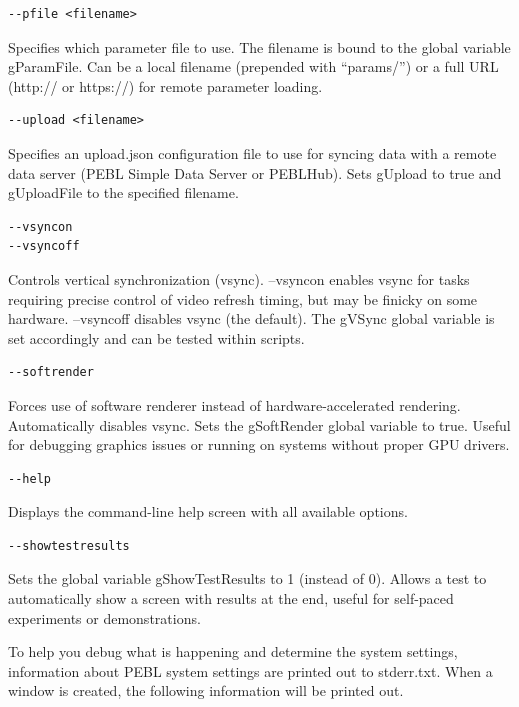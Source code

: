 \begin{description}
\item
\begin{verbatim}
--pfile <filename>
\end{verbatim}
  Specifies which parameter file to use. The filename is bound to the global variable
  gParamFile. Can be a local filename (prepended with ``params/'') or a full URL
  (http:// or https://) for remote parameter loading.

\item
\begin{verbatim}
--upload <filename>
\end{verbatim}
  Specifies an upload.json configuration file to use for syncing data with a
  remote data server (PEBL Simple Data Server or PEBLHub). Sets gUpload to true
  and gUploadFile to the specified filename.

\item
\begin{verbatim}
--vsyncon
--vsyncoff
\end{verbatim}
  Controls vertical synchronization (vsync). --vsyncon enables vsync for tasks
  requiring precise control of video refresh timing, but may be finicky on some
  hardware. --vsyncoff disables vsync (the default). The gVSync global variable
  is set accordingly and can be tested within scripts.

\item
\begin{verbatim}
--softrender
\end{verbatim}
  Forces use of software renderer instead of hardware-accelerated rendering.
  Automatically disables vsync. Sets the gSoftRender global variable to true.
  Useful for debugging graphics issues or running on systems without proper
  GPU drivers.

\item
\begin{verbatim}
--help
\end{verbatim}
  Displays the command-line help screen with all available options.

\item
\begin{verbatim}
--showtestresults
\end{verbatim}
  Sets the global variable gShowTestResults to 1 (instead of 0). Allows a test
  to automatically show a screen with results at the end, useful for self-paced
  experiments or demonstrations.


\end{description}
To help you debug what is happening and determine the system settings, information about PEBL system settings are printed out to stderr.txt.  When a window is created, the following information will be printed out.

